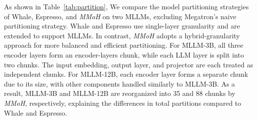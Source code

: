 \documentclass[conference]{IEEEtran}
\begin{document}
As shown in Table~\ref{tab:partition}, We compare the model partitioning strategies of Whale, Espresso, and \textit{MMoH} on two MLLMs, excluding Megatron’s naive partitioning strategy.
Whale and Espresso use single-layer granularity and are extended to support MLLMs. In contrast, \textit{MMoH} adopts a hybrid-granularity approach for more balanced and efficient partitioning.
For MLLM-3B, all three encoder layers form an encoder-layers chunk, while each LLM layer is split into two chunks. The input embedding, output layer, and projector are each treated as independent chunks. 
For MLLM-12B, each encoder layer forms a separate chunk due to its size, with other components handled similarly to MLLM-3B.
As a result, MLLM-3B and MLLM-12B are reorganized into 35 and 88 chunks by \textit{MMoH}, respectively, explaining the differences in total partitions compared to Whale and Espresso.

\end{document}
